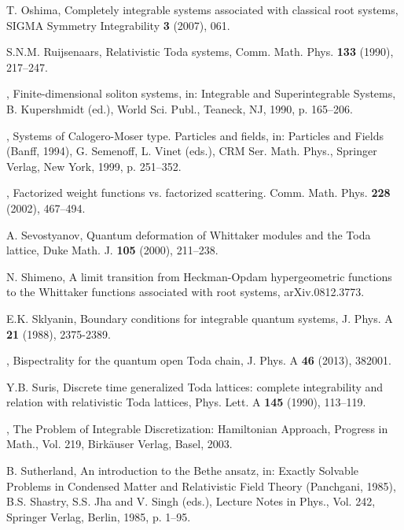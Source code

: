 \documentclass[reqno]{amsart}
\theoremstyle{remark}
\numberwithin{equation}{section}
\begin{document}
\begin{thebibliography}{000000}
 T. Oshima, Completely integrable systems associated with classical root systems,
SIGMA Symmetry Integrability  {\bf 3} (2007), 061.

 S.N.M. Ruijsenaars, Relativistic Toda systems, Comm. Math. Phys. {\bf 133} (1990), 217--247. 

 \bysame, Finite-dimensional soliton systems, in: Integrable and Superintegrable Systems, B. Kupershmidt (ed.),  World Sci. Publ., Teaneck, NJ, 1990, p. 165--206.

 \bysame, Systems of Calogero-Moser type. Particles and fields,  in: Particles and Fields (Banff, 1994), G. Semenoff, L. Vinet (eds.), CRM Ser. Math. Phys., Springer Verlag, New York, 1999, p. 251--352.

 \bysame, Factorized weight functions vs. factorized scattering. Comm. Math. Phys. {\bf 228} (2002), 467--494.

 A. Sevostyanov,
Quantum deformation of Whittaker modules and the Toda lattice, 
Duke Math. J. {\bf 105} (2000), 211--238. 

 N. Shimeno, A limit transition from Heckman-Opdam hypergeometric functions to the Whittaker functions associated with root systems, arXiv.0812.3773.

 E.K. Sklyanin,
Boundary conditions for integrable quantum systems,
J. Phys. A {\bf 21} (1988), 2375-2389.

 \bysame, Bispectrality for the quantum open Toda chain,
J. Phys. A {\bf 46} (2013), 382001.

  Y.B. Suris,  Discrete time generalized Toda lattices: complete integrability and relation with relativistic Toda lattices, Phys. Lett. A {\bf 145} (1990), 113--119.

 \bysame, The Problem of Integrable Discretization: Hamiltonian Approach,
Progress in Math., Vol. 219, Birk\"auser Verlag, Basel, 2003.

 B. Sutherland, An introduction to the Bethe ansatz, in: Exactly Solvable Problems in Condensed Matter and Relativistic Field Theory (Panchgani, 1985), B.S. Shastry, S.S. Jha and V. Singh (eds.),
Lecture Notes in Phys., Vol. {242}, Springer Verlag, Berlin, 1985, p. 1--95.

\end{thebibliography}
\end{document}
